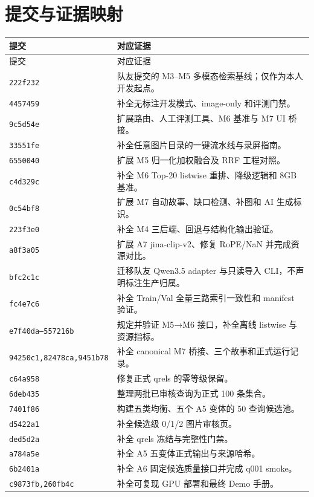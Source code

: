 \documentclass[UTF8,11pt,a4paper]{ctexart}
\begin{document}



\appendix
\section{提交与证据映射}

\small
\begin{longtable}{p{3.4cm}p{9.6cm}}
\toprule
提交 & 对应证据 \\
\midrule
\endfirsthead
\toprule
提交 & 对应证据 \\
\midrule
\endhead
\texttt{222f232} & 队友提交的 M3--M5 多模态检索基线；仅作为本人开发起点。 \\
\texttt{4457459} & 补全无标注开发模式、image-only 和评测门禁。 \\
\texttt{9c5d54e} & 扩展路由、人工评测工具、M6 基准与 M7 UI 桥接。 \\
\texttt{33551fe} & 补全任意图片目录的一键流水线与录屏指南。 \\
\texttt{6550040} & 扩展 M5 归一化加权融合及 RRF 工程对照。 \\
\texttt{c4d329c} & 补全 M6 Top-20 listwise 重排、降级逻辑和 8GB 基准。 \\
\texttt{0c54bf8} & 扩展 M7 自动故事、缺口检测、补图和 AI 生成标识。 \\
\texttt{223f3e0} & 补全 M4 三后端、回退与结构化输出验证。 \\
\texttt{a8f3a05} & 扩展 A7 jina-clip-v2、修复 RoPE/NaN 并完成资源对比。 \\
\texttt{bfc2c1c} & 迁移队友 Qwen3.5 adapter 与只读导入 CLI，不声明标注生产归属。 \\
\texttt{fc4e7c6} & 补全 Train/Val 全量三路索引一致性和 manifest 验证。 \\
\texttt{e7f40da--557216b} & 规定并验证 M5→M6 接口，补全离线 listwise 与资源指标。 \\
\texttt{94250c1,82478ca,}\newline\texttt{9451b78} & 补全 canonical M7 桥接、三个故事和正式运行记录。 \\
\texttt{c64a958} & 修复正式 qrels 的零等级保留。 \\
\texttt{6deb435} & 整理两批已审核查询为正式 100 条集合。 \\
\texttt{7401f86} & 构建五类均衡、五个 A5 变体的 50 查询候选池。 \\
\texttt{d5422a1} & 补全候选级 0/1/2 图片审核页。 \\
\texttt{ded5d2a} & 补全 qrels 冻结与完整性门禁。 \\
\texttt{a784a5e} & 补全 A5 五变体正式输出与来源哈希。 \\
\texttt{6b2401a} & 补全 A6 固定候选质量接口并完成 q001 smoke。 \\
\texttt{c9873fb,260fb4c} & 补全可复现 GPU 部署和最终 Demo 手册。 \\
\bottomrule
\end{longtable}
\end{document}
